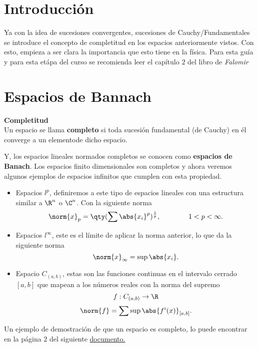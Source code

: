 \section*{Introducción}
Ya con la idea de sucesiones convergentes, sucesiones de Cauchy/Fundamentales se introduce el concepto de completitud en los espacios anteriormente vistos. Con esto, empieza a ser clara la importancia que esto tiene en la física. Para esta guía y para esta etápa del curso se recomienda leer el capítulo $2$ del libro de \textit{Falomir}

\section*{Espacios de Bannach}

\begin{mdframed}[style=warning]
	{\large \textbf{Completitud}} \\
	Un espacio se llama \textbf{completo} si toda sucesión fundamental (de Cauchy) en él converge a un elementode dicho espacio.
\end{mdframed}


Y, los espacios lineales normados completos se conocen como \textbf{espacios de Banach}. Los espacios finito dimensionales son completos y ahora veremos algunos ejemplos de espacios infinitos que cumplen con esta propiedad.

\begin{itemize}
	\item Espacios $l^p$, definiremos a este tipo de espacios lineales con una estructura similar a $\R ^n$ o $\C ^n$. Con la siguiente norma
		$$ \norm{x} _p = \qty(\sum \abs{x_i} ^p)^{\frac{1}{p}}, \qquad \qquad 1 < p < \infty . $$
	\item Espacios $l^\infty$, este es el límite de aplicar la norma anterior, lo que da la siguiente norma
		$$ \norm{x}_\infty = \sup{\abs{x_i}}. $$
	\item Espacio $C_{(a,b)}$, estas son las funciones continuas en el intervalo cerrado $[a,b]$ que mapean a los números reales con la norma del supremo
		$$ f:C_{(a,b)} \to \R $$
		$$ \norm{f} = \sum \sup{\abs{f^i (x)}}_{[a,b]}. $$
\end{itemize}

Un ejemplo de demostración de que un espacio es completo, lo puede encontrar en la página $2$ del siguiente \href{https://github.com/DSarceno/Auxiliatura/blob/main/Metodos\%20Matematicos/Apoyo/gmet4.pdf}{documento.}


